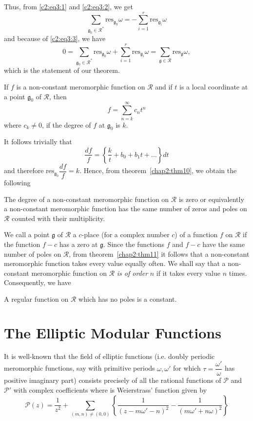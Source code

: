Thus, from \eqref{c2:eq3:1} and \eqref{c2:eq3:2}, we get
$$
\sum_{\mathfrak{g}_0\in \mathscr{R}^{\ast}}
\text{res}_{\mathfrak{g}_0} \omega = - \sum^r_{i=1}
\text{res}_{\mathfrak{g}_i} \omega
$$
and because of \eqref{c2:eq3:3}, we have 
$$
0=\sum_{\mathfrak{g}_0 \in \mathscr{R}^{\ast}}
\text{res}_{\mathfrak{g}_0} \omega + \sum^r_{i=1}
\text{res}_{\mathfrak{g}_i} \omega = \sum_{\mathfrak{g}\in
\mathscr{R}} \text{res}_{\mathfrak{g}} \omega,
$$
which is the statement of our theorem.

If $f$ is a non-constant meromorphic function on $\mathscr{R}$ and if
$t$ is a local coordinate at a point $\mathfrak{g}_0$ of
$\mathscr{R}$, then 
$$
f= \sum^{\infty}_{n=k} c_n t^n
$$
where $c_k \neq 0$, if the degree of $f$ at $\mathfrak{g}_0$ is $k$.

It follows trivially that 
$$
\frac{df}{f} = \left\{\frac{k}{t} +b_0 + b_1 t + \ldots  \right\} dt  
$$
and \pageoriginale therefore $\text{res}_{\mathfrak{g}_0}
\dfrac{df}{f}=k$. Hence, from theorem~\ref{chap2:thm10}, 
we obtain the following 

\begin{thm}\label{chap2:thm11}
The degree of a non-constant meromorphic function on $\mathscr{R}$ is
zero or equivalently a non-constant meromorphic function has the same
number of zeros and poles on $\mathscr{R}$ counted with their
multiplicity. 
\end{thm}

We call a point $\mathfrak{g}$ of $\mathscr{R}$ a $c$-place (for a
complex number $c$) of a function $f$ on $\mathscr{R}$ if the function
$f-c$ has a zero at $\mathfrak{g}$. Since the functions $f$ and $f-c$
have the same number of poles on $\mathscr{R}$, from theorem~\ref{chap2:thm11} it
follows that a non-constant meromorphic function takes every value
equally often. We shall say that a non-constant meromorphic function
on $\mathscr{R}$ \textit{is of order} $n$ if it takes every value $n$
times. Consequently, we have

\begin{thm}\label{chap2:thm12}
A regular function on $\mathscr{R}$ which has no poles is a constant.
\end{thm}


\section{The Elliptic Modular Functions}\label{chap2:sec4}%

It is well-known that the field of elliptic functions (i.e. doubly
periodic meromorphic functions, say with primitive periods $\omega,
\omega'$ for which $\tau = \dfrac{\omega'}{\omega}$ has positive
imaginary part) consists precisely of all the rational functions of
$\mathscr{P}$ and $\mathscr{P}'$ with complex coefficients where is
Weierstrass' function given by 
$$
\mathscr{P} (z)=\frac{1}{z^2} + \sum_{(m,n)\neq (0,0)} \left\{
\frac{1}{(z-m\omega' -n)^2} -\frac{1}{(m\omega'+n\omega)^2}\right\}
$$

